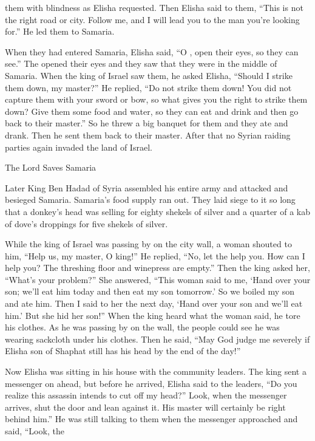 {them with blindness
as Elisha
requested.
Then Elisha
said
to them,
“This
is not
the right road
or
city.
Follow
me, and I will lead
you to
the man
you’re
looking
for.” He led
them to Samaria.
\par }{\PP {}When
they had entered
Samaria,
Elisha
said,
“O
{}, open
their eyes,
so they can
see.”
The
{}
opened
their eyes
and they saw
that they were
in the middle
of Samaria.
When the king
of Israel
saw
them, he asked
Elisha,
“Should I strike
them down,
my master?”
He replied,
“Do not
strike
them down! You did not capture
them with your sword
or bow,
so what
gives you
the right to strike
them down? Give
them some food
and water,
so they can eat
and drink
and then go
back to
their master.”
So he threw
a big
banquet
for them
and they
ate
and drank.
Then he sent
them back
to
their master.
After that no
Syrian
raiding parties
again
invaded
the land
of Israel.
\par }{\SH The Lord Saves Samaria
\par }{\PP {}Later
King
Ben Hadad
of Syria
assembled
his entire
army
and attacked
and besieged
Samaria.
Samaria’s
food supply ran out.
They laid siege
to
it so long
that a donkey’s
head
was
selling for eighty
shekels of silver
and a quarter
of a kab
of dove’s droppings
for five shekels
of silver.
\par }{\PP {}While
the king
of Israel
was passing
by on
the city wall,
a woman
shouted
to him,
“Help
us, my master,
O king!”
He replied,
“No,
let the
{}
help
you. How
can I help
you? The threshing floor
and
winepress are empty.”
Then the king
asked
her, “What’s
your problem?” She answered,
“This
woman
said
to me,
‘Hand
over your son;
we’ll eat
him today
and then
eat
my son
tomorrow.’
So we boiled
my son
and ate
him. Then I said
to
her the next
day,
‘Hand
over your son
and we’ll eat
him.’ But she hid
her son!”
When
the king
heard
what
the woman
said, he tore
his clothes.
As he was passing
by on
the wall,
the people
could see
he was wearing sackcloth
under his clothes.
Then he said,
“May
God
judge me severely
if
Elisha
son
of Shaphat
still
has his head
by the end of the day!”
\par }{\PP {}Now Elisha
was sitting
in his house
with
the community leaders.
The king sent
a messenger
on ahead,
but before
he arrived,
Elisha said
to
the leaders, “Do you realize
this
assassin
intends
to cut off
my head?” Look,
when the messenger
arrives,
shut
the door
and lean against
it. His master
will certainly be right behind him.”
He was still
talking
to them when
the messenger
approached
and said,
“Look,
the

}
